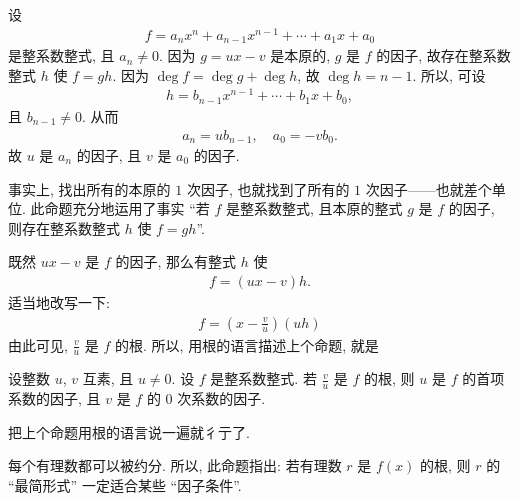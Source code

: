 \begin{pf}
    设
    \begin{align*}
        f = a_n x^n + a_{n-1} x^{n-1} + \cdots + a_1 x + a_0
    \end{align*}
    是整系数整式, 且 $a_n \neq 0$. 因为 $g = ux - v$ 是本原的, $g$ 是 $f$ 的因子, 故存在整系数整式 $h$ 使 $f = gh$. 因为 $\deg f = \deg g + \deg h$, 故 $\deg h = n - 1$. 所以, 可设
    \begin{align*}
        h = b_{n-1} x^{n-1} + \cdots + b_1 x + b_0,
    \end{align*}
    且 $b_{n-1} \neq 0$. 从而
    \begin{align*}
        a_n = ub_{n-1}, \quad a_0 = -vb_0.
    \end{align*}
    故 $u$ 是 $a_n$ 的因子, 且 $v$ 是 $a_0$ 的因子.
\end{pf}

\begin{remark}
    事实上, 找出所有的本原的 $1$ 次因子, 也就找到了所有的 $1$ 次因子——也就差个单位. 此命题充分地运用了事实 ``若 $f$ 是整系数整式, 且本原的整式 $g$ 是 $f$ 的因子, 则存在整系数整式 $h$ 使 $f = gh$''.
\end{remark}

既然 $ux - v$ 是 $f$ 的因子, 那么有整式 $h$ 使
\begin{align*}
    f = (ux - v) h.
\end{align*}
适当地改写一下:
\begin{align*}
    f = \left( x - \frac{v}{u} \right) (uh)
\end{align*}
由此可见, $\frac{v}{u}$ 是 $f$ 的根. 所以, 用根的语言描述上个命题, 就是
\begin{proposition}
    设整数 $u$, $v$ 互素, 且 $u \neq 0$. 设 $f$ 是整系数整式. 若 $\frac{v}{u}$ 是 $f$ 的根, 则 $u$ 是 $f$ 的首项系数的因子, 且 $v$ 是 $f$ 的 $0$ 次系数的因子.
\end{proposition}

\begin{pf}
    把上个命题用根的语言说一遍就彳亍了.
\end{pf}

\begin{remark}
    每个有理数都可以被约分. 所以, 此命题指出: 若有理数 $r$ 是 $f(x)$ 的根, 则 $r$ 的 ``最简形式'' 一定适合某些 ``因子条件''.
\end{remark}

